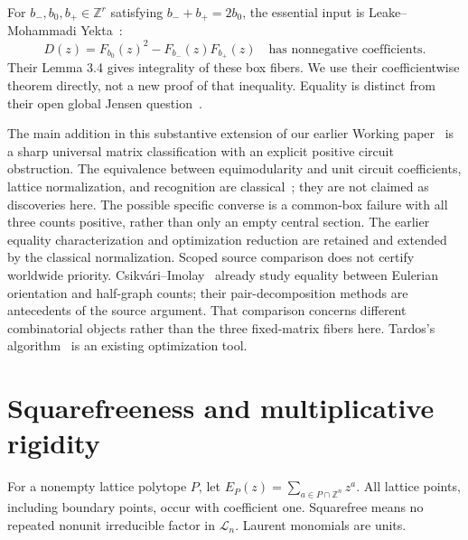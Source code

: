 \documentclass[11pt]{article}
\newcommand{\Z}{\mathbb Z}\newcommand{\R}{\mathbb R}\newcommand{\C}{\mathbb C}
\begin{document}
For \(b_-,b_0,b_+\in\Z^r\) satisfying \(b_-+b_+=2b_0\), the essential input is Leake--Mohammadi Yekta~\cite[Theorem 3.1]{LMY}:
\begin{equation}\label{eq:input}
D(z)=F_{b_0}(z)^2-F_{b_-}(z)F_{b_+}(z)
\quad\text{has nonnegative coefficients.}
\end{equation}
Their Lemma 3.4 gives integrality of these box fibers. We use their coefficientwise theorem directly, not a new proof of that inequality. Equality is distinct from their open global Jensen question~\cite[Question 1.7]{LMY}.

The main addition in this substantive extension of our earlier Working paper~\cite{V1} is a sharp universal matrix classification with an explicit positive circuit obstruction. The equivalence between equimodularity and unit circuit coefficients, lattice normalization, and recognition are classical~\cite{Heller,BS,CGR}; they are not claimed as discoveries here. The possible specific converse is a common-box failure with all three counts positive, rather than only an empty central section. The earlier equality characterization and optimization reduction are retained and extended by the classical normalization. Scoped source comparison does not certify worldwide priority. Csikvári--Imolay~\cite{CI} already study equality between Eulerian orientation and half-graph counts; their pair-decomposition methods are antecedents of the source argument. That comparison concerns different combinatorial objects rather than the three fixed-matrix fibers here. Tardos's algorithm~\cite{Tardos} is an existing optimization tool.



\section{Squarefreeness and multiplicative rigidity}
For a nonempty lattice polytope \(P\), let
\(E_P(z)=\sum_{a\in P\cap\Z^n}z^a\).
All lattice points, including boundary points, occur with coefficient one.
Squarefree means no repeated nonunit irreducible factor in \(\mathcal L_n\). Laurent monomials are units.
\end{document}
